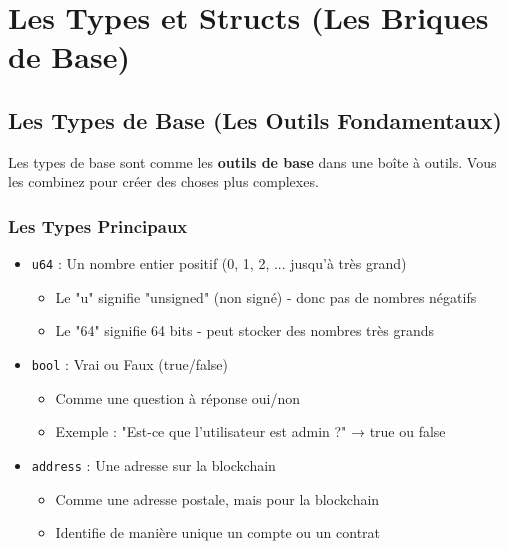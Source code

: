 \documentclass[11pt]{article}
\begin{document}
\section{Les Types et Structs (Les Briques de Base)}

\subsection{Les Types de Base (Les Outils Fondamentaux)}

\begin{explainBox}
Les types de base sont comme les \textbf{outils de base} dans une boîte à outils. Vous les combinez pour créer des choses plus complexes.
\end{explainBox}

\subsubsection{Les Types Principaux}

\begin{itemize}
  \item \texttt{u64} : Un nombre entier positif (0, 1, 2, ... jusqu'à très grand)
  \begin{itemize}
    \item Le "u" signifie "unsigned" (non signé) - donc pas de nombres négatifs
    \item Le "64" signifie 64 bits - peut stocker des nombres très grands
  \end{itemize}
  
  \item \texttt{bool} : Vrai ou Faux (true/false)
  \begin{itemize}
    \item Comme une question à réponse oui/non
    \item Exemple : "Est-ce que l'utilisateur est admin ?" → true ou false
  \end{itemize}
  
  \item \texttt{address} : Une adresse sur la blockchain
  \begin{itemize}
    \item Comme une adresse postale, mais pour la blockchain
    \item Identifie de manière unique un compte ou un contrat
  \end{itemize}
\end{itemize}
\end{document}
